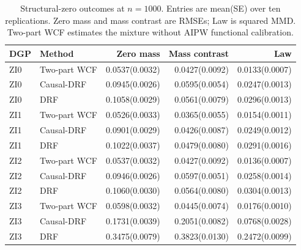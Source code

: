 \begin{table}[t]
\centering
\scriptsize
\setlength{\tabcolsep}{3pt}
\caption{Structural-zero outcomes at $n=1000$. Entries are mean(SE) over ten replications. Zero mass and mass contrast are RMSEs; Law is squared MMD. Two-part WCF estimates the mixture without AIPW functional calibration.}
\label{tab:revision-zi}
\begin{tabular}{llrrr}
\toprule
DGP & Method & Zero mass & Mass contrast & Law \\
\midrule
ZI0 & Two-part WCF & 0.0537(0.0032) & 0.0427(0.0092) & 0.0133(0.0007) \\
ZI0 & Causal-DRF & 0.0945(0.0026) & 0.0595(0.0054) & 0.0247(0.0013) \\
ZI0 & DRF & 0.1058(0.0029) & 0.0561(0.0079) & 0.0296(0.0013) \\
ZI1 & Two-part WCF & 0.0526(0.0033) & 0.0365(0.0055) & 0.0154(0.0011) \\
ZI1 & Causal-DRF & 0.0901(0.0029) & 0.0426(0.0087) & 0.0249(0.0012) \\
ZI1 & DRF & 0.1022(0.0037) & 0.0479(0.0080) & 0.0291(0.0016) \\
ZI2 & Two-part WCF & 0.0537(0.0032) & 0.0427(0.0092) & 0.0136(0.0007) \\
ZI2 & Causal-DRF & 0.0946(0.0026) & 0.0597(0.0051) & 0.0258(0.0014) \\
ZI2 & DRF & 0.1060(0.0030) & 0.0564(0.0080) & 0.0304(0.0013) \\
ZI3 & Two-part WCF & 0.0598(0.0032) & 0.0445(0.0074) & 0.0176(0.0010) \\
ZI3 & Causal-DRF & 0.1731(0.0039) & 0.2051(0.0082) & 0.0768(0.0028) \\
ZI3 & DRF & 0.3475(0.0079) & 0.3823(0.0130) & 0.2472(0.0099) \\
\bottomrule
\end{tabular}
\end{table}
